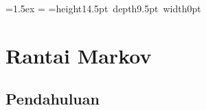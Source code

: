 \newdimen\snellbaselineskip
\newdimen\snellskip
\snellskip=1.5ex
\snellbaselineskip=\baselineskip
\def\srule{\omit\kern.5em\vrule\kern-.5em}
\newbox\bigstrutbox
\setbox\bigstrutbox=\hbox{\vrule height14.5pt depth9.5pt width0pt}
\def\bigstrut{\relax\ifmmode\copy\bigstrutbox\else\unhcopy\bigstrutbox\fi}
\def\middlehrule#1#2{\noalign{\kern-\snellbaselineskip\kern\snellskip}
&\multispan#1\strut\hrulefill
&\omit\hbox to.5em{\hrulefill}\vrule 
height \snellskip\kern-.5em&\multispan#2\hrulefill\cr}

\makeatletter
\def\bordermatrix#1{\begingroup \m@th
  \@tempdima 8.75\p@
  \setbox\z@\vbox{%
    \def\cr{\crcr\noalign{\kern2\p@\global\let\cr\endline}}%
    \ialign{$##$\hfil\kern2\p@\kern\@tempdima&\thinspace\hfil$##$\hfil
      &&\quad\hfil$##$\hfil\crcr
      \omit\strut\hfil\crcr\noalign{\kern-\snellbaselineskip}%
      #1\crcr\omit\strut\cr}}%
  \setbox\tw@\vbox{\unvcopy\z@\global\setbox\@ne\lastbox}%
  \setbox\tw@\hbox{\unhbox\@ne\unskip\global\setbox\@ne\lastbox}%
  \setbox\tw@\hbox{$\kern\wd\@ne\kern-\@tempdima\left(\kern-\wd\@ne
    \global\setbox\@ne\vbox{\box\@ne\kern2\p@}%
    \vcenter{\kern-\ht\@ne\unvbox\z@\kern-\snellbaselineskip}\,\right)$}%
  \null\;\vbox{\kern\ht\@ne\box\tw@}\endgroup}

\makeatother




\chapter{Rantai Markov}\label{chp 11}

\section{Pendahuluan}\label{sec 11.1}

